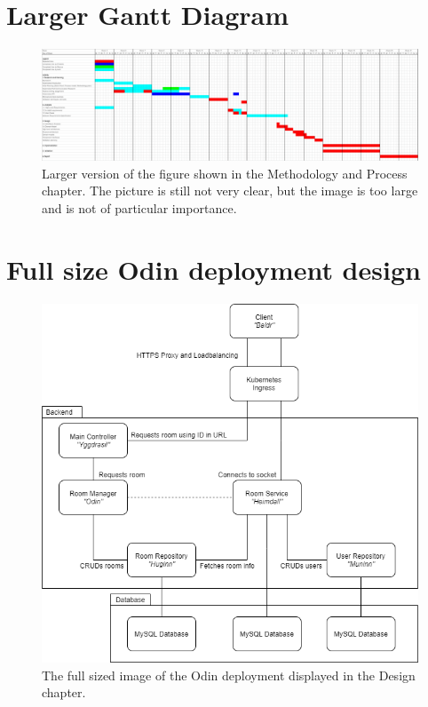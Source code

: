 \chapter{Larger Gantt Diagram}

\begin{figure}[H]
    \centering
    \includegraphics[width=0.8\textheight,angle=90]{Pictures/Gantt.png}
    \caption{Larger version of the figure shown in the Methodology and Process chapter. The picture is still not very clear, but the image is too large and is not of particular importance.}
    \label{fig:ganttLarge}
\end{figure}

\newpage
\chapter{Full size Odin deployment design}

\begin{figure}[h]
    \centering
    \includegraphics[width=\textwidth]{Pictures/Odin Final Design.png}
    \caption{The full sized image of the Odin deployment displayed in the Design chapter.}
    \label{fig:odinDesignFullSized}
\end{figure}

